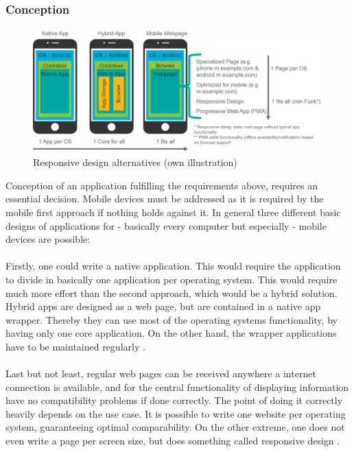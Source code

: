 \subsubsection{Conception}

\begin{figure}[H]
    \centering
    \includegraphics[width=\textwidth]{img/Alternatives.png}
    \caption[Responsive design alternatives]{Responsive design alternatives (own illustration)}
    \label{fig:}
\end{figure}

Conception of an application fulfilling the requirements above, requires an essential decision. Mobile devices must be addressed as it is required by the mobile first approach if nothing holds against it. In general three different basic designs of applications for - basically every computer but especially - mobile devices are possible:

\paragraph{} Firstly, one could write a native application. This would require the application to divide in basically one application per operating system. This would require much more effort than the second approach, which would be a hybrid solution. Hybrid apps are designed as a web page, but are contained in a native app wrapper. Thereby they can use most of the operating systems functionality, by having only one core application. On the other hand, the wrapper applications have to be maintained regularly \parencite[cf.][]{Vaiyapuri.25.05.2015}. 

\paragraph{} Last but not least, regular web pages can be received anywhere a internet connection is available, and for the central functionality of displaying information have no compatibility problems if done correctly. The point of doing it correctly heavily depends on the use case. It is possible to write one website per operating system, guaranteeing optimal comparability. On the other extreme, one does not even write a page per screen size, but does something called responsive design \parencite[cf.][]{Vaiyapuri.25.05.2015}. 

